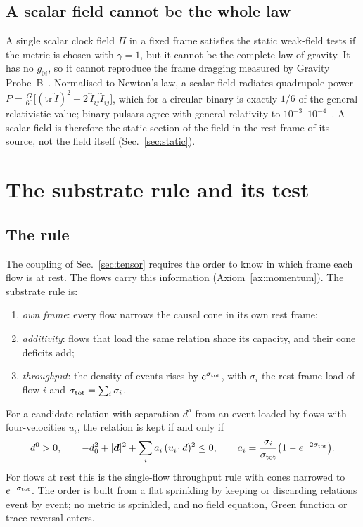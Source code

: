 \subsection{A scalar field cannot be the whole law}

A single scalar clock field $\Pi$ in a fixed frame satisfies the static weak-field tests if the metric
is chosen with $\gamma=1$, but it cannot be the complete law of gravity. It has no $g_{0i}$, so it
cannot reproduce the frame dragging measured by Gravity Probe~B~\cite{Everitt2011}. Normalised to
Newton's law, a scalar field radiates quadrupole power
$P=\tfrac{G}{60}\big[(\mathrm{tr}\,\dddot I)^2+2\,\dddot I_{ij}\dddot I_{ij}\big]$, which for a circular
binary is exactly $1/6$ of the general relativistic value; binary pulsars agree with general relativity
to $10^{-3}$--$10^{-4}$~\cite{Kramer2021}. A scalar field is therefore the static section of the field in the rest frame
of its source, not the field itself (Sec.~\ref{sec:static}).

\section{The substrate rule and its test}\label{sec:rule}

\subsection{The rule}

The coupling of Sec.~\ref{sec:tensor} requires the order to know in which frame each flow is at rest.
The flows carry this information (Axiom~\ref{ax:momentum}). The substrate rule is:
\begin{enumerate}
\item \emph{own frame}: every flow narrows the causal cone in its own rest frame;
\item \emph{additivity}: flows that load the same relation share its capacity, and their cone deficits
  add;
\item \emph{throughput}: the density of events rises by $e^{\sigma_{\rm tot}}$, with $\sigma_i$ the
  rest-frame load of flow $i$ and $\sigma_{\rm tot}=\sum_i\sigma_i$.
\end{enumerate}
For a candidate relation with separation $d^a$ from an event loaded by flows with four-velocities
$u_i$, the relation is kept if and only if
\begin{equation}\label{eq:rule}
  d^0>0,\qquad -d_0^2+|\vec d|^2+\sum_i a_i\,(u_i\!\cdot d)^2\le0,\qquad
  a_i=\frac{\sigma_i}{\sigma_{\rm tot}}\big(1-e^{-2\sigma_{\rm tot}}\big).
\end{equation}
For flows at rest this is the single-flow throughput rule with cones narrowed to $e^{-\sigma_{\rm tot}}$.
The order is built from a flat sprinkling by keeping or discarding relations event by event; no metric
is sprinkled, and no field equation, Green function or trace reversal enters.

